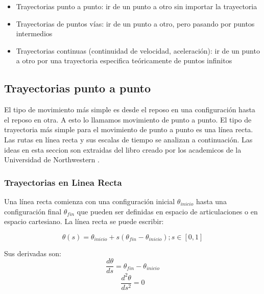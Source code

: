             \begin{itemize}
                \item 	 Trayectorias punto a punto: ir de un punto a otro sin importar la trayectoria 
                \item 	 Trayectorias de puntos vías: ir de un punto a otro, pero pasando por puntos intermedios
                \item 	 Trayectorias continuas (continuidad de velocidad, aceleración): ir de un punto a otro por una trayectoria especifica teóricamente de puntos infinitos
            \end{itemize}
        

    \subsection{Trayectorias punto a punto}
        El tipo de movimiento más simple es desde el reposo en una configuración hasta el reposo en otra. A esto lo llamamos movimiento de punto a punto. El tipo de trayectoria más simple para el movimiento de punto a punto es una línea recta. Las rutas en línea recta y sus escalas de tiempo se analizan a continuación. Las ideas en esta seccion son extraidas del libro creado por los academicos de la Universidad de Northwestern  \cite{moder_robot}.
    
        \subsubsection{Trayectorias en Linea Recta}
            Una línea recta comienza con una configuración inicial $\theta_{inicio}$ hasta una configuración final $\theta_{fin}$ que pueden ser definidas en espacio de articulaciones o en espacio cartesiano. La línea recta se puede escribir: 
        
            \begin{equation}
                \theta(s)= \theta_{inicio} + s(\theta_{fin}-\theta_{inicio}) ; s \in [0,1]
                \label{eq:cap4_tray_9}
             \end{equation}
            
            Sus derivadas son:
            \begin{equation}
                \frac{d\theta}{ds}=\theta_{fin}-\theta_{inicio}
                \label{eq:cap4_tray_10}
             \end{equation}      
            \begin{equation}
                \frac{d^2\theta}{ds^2}=0
                \label{eq:cap4_tray_11}
             \end{equation}  
            
